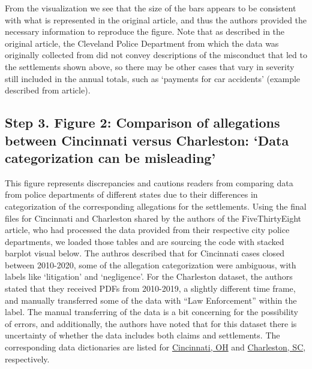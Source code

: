 \documentclass[
  letterpaper,
  DIV=11,
  numbers=noendperiod]{scrartcl}
\begin{document}
From the visualization we see that the size of the bars appears to be
consistent with what is represented in the original article, and thus
the authors provided the necessary information to reproduce the figure.
Note that as described in the original article, the Cleveland Police
Department from which the data was originally collected from did not
convey descriptions of the misconduct that led to the settlements shown
above, so there may be other cases that vary in severity still included
in the annual totals, such as `payments for car accidents' (example
described from article).

\subsection{Step 3. Figure 2: Comparison of allegations between
Cincinnati versus Charleston: `Data categorization can be
misleading'}\label{step-3.-figure-2-comparison-of-allegations-between-cincinnati-versus-charleston-data-categorization-can-be-misleading}

This figure represents discrepancies and cautions readers from comparing
data from police departments of different states due to their
differences in categorization of the corresponding allegations for the
settlements. Using the final files for Cincinnati and Charleston shared
by the authors of the FiveThirtyEight article, who had processed the
data provided from their respective city police departments, we loaded
those tables and are sourcing the code with stacked barplot visual
below. The authros described that for Cincinnati cases closed between
2010-2020, some of the allegation categorization were ambiguous, with
labels like `litigation' and `negligence'. For the Charleston dataset,
the authors stated that they received PDFs from 2010-2019, a slightly
different time frame, and manually transferred some of the data with
``Law Enforcement'' within the label. The manual transferring of the
data is a bit concerning for the possibility of errors, and
additionally, the authors have noted that for this dataset there is
uncertainty of whether the data includes both claims and settlements.
The corresponding data dictionaries are listed for
\href{'https://github.com/fivethirtyeight/police-settlements/tree/main/cincinnati_oh'}{Cincinnati,
OH} and
\href{'https://github.com/fivethirtyeight/police-settlements/tree/main/charleston_sc'}{Charleston,
SC}, respectively.
\end{document}
